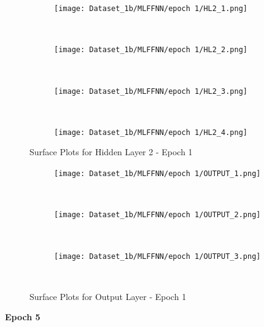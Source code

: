 \newpage

\begin{figure}[!ht]
    \centering
    \begin{subfigure}[h]{0.5\textwidth}
        \centering
        \texttt{[image: Dataset\_1b/MLFFNN/epoch 1/HL2\_1.png]}
    \end{subfigure}%
    ~ 
    \begin{subfigure}[h]{0.5\textwidth}
        \centering
        \texttt{[image: Dataset\_1b/MLFFNN/epoch 1/HL2\_2.png]}
    \end{subfigure}%
    ~
    
    \begin{subfigure}[h]{0.4\textwidth}
        \centering
        \texttt{[image: Dataset\_1b/MLFFNN/epoch 1/HL2\_3.png]}
    \end{subfigure}
    ~
    \begin{subfigure}[h]{0.4\textwidth}
        \centering
        \texttt{[image: Dataset\_1b/MLFFNN/epoch 1/HL2\_4.png]}
    \end{subfigure}
    \caption{Surface Plots for Hidden Layer 2 - Epoch 1}
    \label{fig:13}
\end{figure}


\begin{figure}[!ht]
    \centering
    \begin{subfigure}[h]{0.5\textwidth}
        \centering
        \texttt{[image: Dataset\_1b/MLFFNN/epoch 1/OUTPUT\_1.png]}
    \end{subfigure}%
    ~ 
    \begin{subfigure}[h]{0.5\textwidth}
        \centering
        \texttt{[image: Dataset\_1b/MLFFNN/epoch 1/OUTPUT\_2.png]}
    \end{subfigure}%
    ~
    
    \begin{subfigure}[h]{0.4\textwidth}
        \centering
        \texttt{[image: Dataset\_1b/MLFFNN/epoch 1/OUTPUT\_3.png]}
    \end{subfigure}
    ~
    \caption{Surface Plots for Output Layer - Epoch 1}
    \label{fig:13}
\end{figure}


\newpage
\textbf{Epoch 5}

